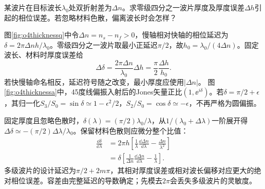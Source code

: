 \begin{exercise}\label{ex:o4retardthickness}
某波片在目标波长$\lambda_0$处双折射差为$\Delta n$。求零级四分之一波片厚度及厚度误差$\Delta h$引起的相位误差。若忽略材料色散，偏离波长时会怎样？
\end{exercise}
\begin{solution}
图\ref{fig:o4thicknessq}中令$\Delta n=n_s-n_f>0$，慢轴相对快轴的相位延迟为$\delta=2\pi\Delta n h/\lambda_0$。零级四分之一波片取最小正延迟$\pi/2$，故$h_0=\lambda_0/(4\Delta n)$。固定波长、材料时厚度误差给
\[
 \Delta\delta=\frac{2\pi\Delta n}{\lambda_0}\Delta h
 =\frac\pi2\frac{\Delta h}{h_0}.
\]
若快慢轴命名相反，延迟符号随之改变，最小厚度应使用$|\Delta n|$。
图\ref{fig:o4thicknessa}中，45度线偏振入射后的Jones矢量正比$(1,\ee^{i\delta})$。若$\delta=\pi/2+\epsilon$，其归一化$S_3/S_0=\sin\delta\simeq1-\epsilon^2/2$，$S_2/S_0=\cos\delta\simeq-\epsilon$，不再严格为圆偏振。

固定厚度且忽略色散时，$\delta(\lambda)=(\pi/2)\lambda_0/\lambda$，从$1/(\lambda_0+\Delta\lambda)$一阶展开得$\Delta\delta\simeq-(\pi/2)\Delta\lambda/\lambda_0$。保留材料色散则应微分整个比值：
\begin{align*}
 \frac{\dd\delta}{\dd\lambda}
 &=2\pi h\left[\frac1\lambda\frac{\dd\Delta n}{\dd\lambda}-\frac{\Delta n}{\lambda^2}\right]\\
 &=\delta\left[\frac1{\Delta n}\frac{\dd\Delta n}{\dd\lambda}-\frac1\lambda\right].
\end{align*}
多级波片的设计延迟为$\pi/2+2m\pi$，其相对厚度误差或相对波长偏移对应更大的绝对相位误差。容差由完整延迟的导数确定；先模去$2\pi$会丢失多级波片的灵敏度。
\end{solution}
